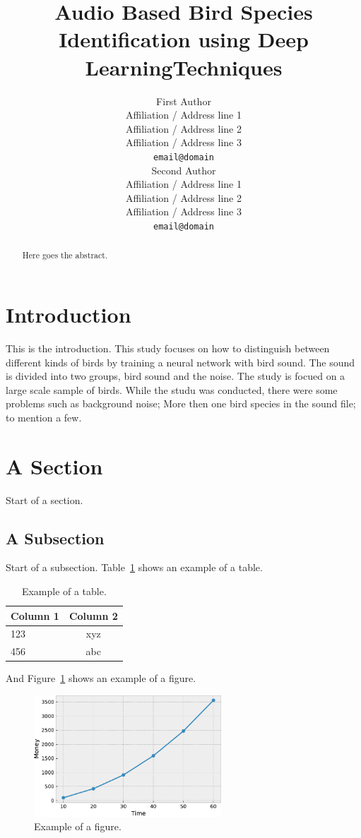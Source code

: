 \documentclass[11pt]{article}
\title{Audio Based Bird Species Identification using Deep LearningTechniques}
\author{First Author \\
  Affiliation / Address line 1 \\
  Affiliation / Address line 2 \\
  Affiliation / Address line 3 \\
  {\tt email@domain} \\\And
  Second Author \\
  Affiliation / Address line 1 \\
  Affiliation / Address line 2 \\
  Affiliation / Address line 3 \\
  {\tt email@domain} \\}
\date{}
\begin{document}
\maketitle
\begin{abstract}
Here goes the abstract.
\end{abstract}

\section{Introduction}
This is the introduction.
This study focuses on how to distinguish between different kinds of birds by training a neural network with bird sound. 
The sound is divided into two groups, bird sound and the noise. The study is focued on a large scale sample of birds. While 
the studu was conducted, there were some problems such as background noise; More then one bird species in the sound file; 
to mention a few.

\section{A Section}

Start of a section.

\subsection{A Subsection}

Start of a subsection. Table~\ref{table:exampletable} shows an example of a table.

\begin{table}[htb]
\begin{center}
\begin{tabular}{l|c}
\hline \bf Column 1 & \bf Column 2\\ \hline
123 & xyz \\
456 & abc %
\end{tabular}
\end{center}
\caption{Example of a table.}
\label{table:exampletable}
\end{table}

And Figure~\ref{fig:examplefig} shows an example of a figure.

\begin{figure}[htb]
\begin{center}
\includegraphics[width=70mm]{example_figure}
\end{center}
\caption{Example of a figure.}
\label{fig:examplefig}
\end{figure}
\end{document}
